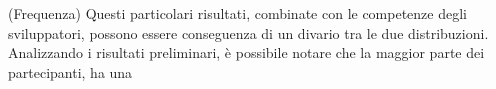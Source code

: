 (Frequenza) Questi particolari risultati, combinate con le competenze degli sviluppatori, possono essere conseguenza di un divario tra le due distribuzioni. Analizzando i risultati preliminari, è possibile notare che la maggior parte dei partecipanti, ha una 